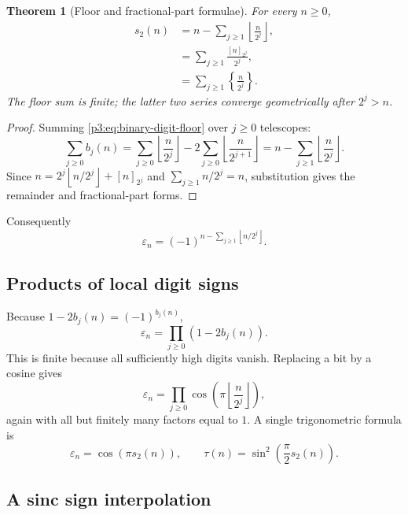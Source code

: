 \documentclass[11pt,oneside]{article}
\newtheorem{theorem}{Theorem}[section]
\theoremstyle{definition}
\theoremstyle{remark}
\newcommand{\bitsum}{s_2}
\newcommand{\eps}{\varepsilon}
\newcommand{\floor}[1]{\left\lfloor #1\right\rfloor}
\newcommand{\fracp}[1]{\left\{#1\right\}}
\begin{document}
\begin{theorem}[Floor and fractional-part formulae]\label{p3:thm:floor-formulas}
For every $n\ge0$,
\begin{align}
 \bitsum(n)
 &=n-\sum_{j\ge1}\floor{\frac{n}{2^j}},\label{p3:eq:legendre-floor}\\
 &=\sum_{j\ge1}\frac{[n]_{2^j}}{2^j},\label{p3:eq:remainder-sum}\\
 &=\sum_{j\ge1}\fracp{\frac{n}{2^j}}.\label{p3:eq:fractional-parts}
\end{align}
The floor sum is finite; the latter two series converge geometrically after
$2^j>n$.
\end{theorem}

\begin{proof}
Summing \cref{p3:eq:binary-digit-floor} over $j\ge0$ telescopes:
\[
 \sum_{j\ge0}b_j(n)
 =\sum_{j\ge0}\floor{\frac n{2^j}}
  -2\sum_{j\ge0}\floor{\frac n{2^{j+1}}}
 =n-\sum_{j\ge1}\floor{\frac n{2^j}}.
\]
Since $n=2^j\floor{n/2^j}+[n]_{2^j}$ and
$\sum_{j\ge1}n/2^j=n$, substitution gives the remainder and
fractional-part forms.
\end{proof}

Consequently
\begin{equation}\label{p3:eq:floor-sign}
  \eps_n=(-1)^{n-\sum_{j\ge1}\floor{n/2^j}}.
\end{equation}

\subsection{Products of local digit signs}

Because $1-2b_j(n)=(-1)^{b_j(n)}$,
\begin{equation}\label{p3:eq:digit-product}
 \eps_n=\prod_{j\ge0}(1-2b_j(n)).
\end{equation}
This is finite because all sufficiently high digits vanish.  Replacing a bit by
a cosine gives
\begin{equation}\label{p3:eq:cos-floor-product}
 \eps_n=\prod_{j\ge0}\cos\!\left(\pi\floor{\frac{n}{2^j}}\right),
\end{equation}
again with all but finitely many factors equal to $1$.  A single trigonometric
formula is
\begin{equation}\label{p3:eq:single-cosine}
 \eps_n=\cos(\pi\bitsum(n)),
 \qquad
 \tau(n)=\sin^2\!\left(\frac{\pi}{2}\bitsum(n)\right).
\end{equation}

\subsection{A sinc sign interpolation}
\end{document}
